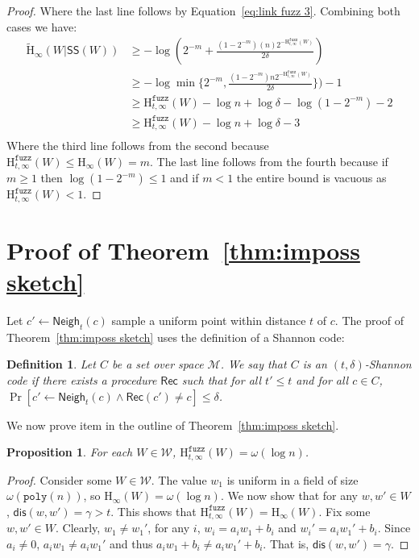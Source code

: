 \documentclass[11pt]{article}
\newcommand{\thref}[1]{\mbox{Theorem~\ref{#1}}}
\newcommand{\class}[1]{{\ensuremath{\mathsf{#1}}}}
\newcommand{\sketch}{\ensuremath{\class{SS}}\xspace}
\newcommand{\rec}{\ensuremath{\class{Rec}}\xspace}
\newcommand{\neigh}{\ensuremath{\class{Neigh}}\xspace}
\newcommand{\dis}{\ensuremath{\mathsf{dis}}}
\newcommand{\poly}{\ensuremath{\mathtt{poly}}\xspace}
\newcommand{\Hoo}{\mathrm{H}_\infty}
\newcommand{\Hav}{\tilde{\mathrm{H}}_\infty}
\newcommand{\Hfuzz}{\mathrm{H}^{\mathtt{fuzz}}_{t,\infty}}
\newtheorem{proposition}[theorem]{Proposition}
\newtheorem{definition}[theorem]{Definition}
\begin{document}
\begin{proof}
Where the last line follows by Equation~\eqref{eq:link fuzz 3}.
Combining both cases we have:
\begin{align*}
\Hav(W | \sketch(W)) &\ge -\log \left(2^{-m}+\frac{(1-2^{-m})(n)2^{-\Hfuzz(W)}}{2\delta}\right)\\
&\ge -\log \min\{2^{-m}, \frac{(1-2^{-m}) n2^{-\Hfuzz(W)}}{2\delta}\})-1\\
&\ge \Hfuzz(W) - \log n + \log \delta - \log (1-2^{-m}) - 2\\
&\ge \Hfuzz(W) - \log n + \log \delta - 3\\
\end{align*}
Where the third line follows from the second because $\Hfuzz(W)\le \Hoo(W) = m$. The last line follows from the fourth because if $m\ge 1$ then $\log (1-2^{-m})\le 1$ and if $m< 1$ the entire bound is vacuous as $\Hfuzz(W)< 1$.
\end{proof}

\section{Proof of \thref{thm:imposs sketch}}
\label{sec:proof secure sketch imposs}
Let $c'\leftarrow \neigh_t(c)$ sample a uniform point within distance $t$ of $c$.  
The proof of \thref{thm:imposs sketch} uses the definition of a Shannon code: 
\begin{definition}
\label{def:shannon-code}
Let $C$ be a set over space $\mathcal{M}$.  We say that $C$ is an $(t,\delta)$-\emph{Shannon code} if there exists a procedure $\rec$ such that for all $t'\le t$ and for all $c\in C$, $\Pr[c'\leftarrow \neigh_t(c) \wedge \rec(c') \neq c]\le \delta$. %
\end{definition}

\noindent
We now prove item in the outline of \thref{thm:imposs sketch}.

\begin{proposition} 
\label{prop:each element good} For each $W\in\mathcal{W}$, $\Hfuzz(W) = \omega(\log n)$.
\end{proposition}
\begin{proof}
Consider some $W\in\mathcal{W}$.  The value $w_1$ is uniform in a field of size $\omega(\poly(n))$, so $\Hoo(W) =\omega(\log n)$.  We now show that for any $w, w'\in W$, $\dis(w, w') = \gamma>t$.  This shows that $\Hfuzz(W) = \Hoo(W)$.  Fix some $w, w'\in W$.  Clearly, $w_1 \neq w_1'$, for any $i$, $w_i = a_i w_1 + b_i$ and $w_i' = a_i w_1' + b_i$.  Since $a_i\neq 0$, $a_iw_1 \neq a_iw_1'$ and thus $a_iw_1+b_i \neq a_iw_1'+b_i$.  That is, $\dis (w, w')  =\gamma$.
\end{proof}
\end{document}
